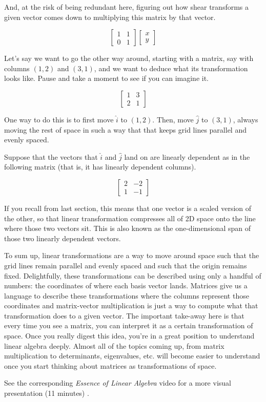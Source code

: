 And, at the risk of being redundant here, figuring out how shear transforms a
given vector comes down to multiplying this matrix by that vector.

\begin{equation*}
  \begin{bmatrix}
    1 & 1 \\
    0 & 1
  \end{bmatrix} \begin{bmatrix}
    x \\
    y
  \end{bmatrix}
\end{equation*}

Let's say we want to go the other way around, starting with a matrix, say with
columns $(1, 2)$ and $(3, 1)$, and we want to deduce what its transformation
looks like. Pause and take a moment to see if you can imagine it.

\begin{equation*}
  \begin{bmatrix}
    1 & 3 \\
    2 & 1
  \end{bmatrix}
\end{equation*}

One way to do this is to first move $\hat{i}$ to $(1, 2)$. Then, move $\hat{j}$
to $(3, 1)$, always moving the rest of space in such a way that that keeps grid
lines parallel and evenly spaced.

Suppose that the vectors that $\hat{i}$ and $\hat{j}$ land on are linearly
dependent as in the following matrix (that is, it has linearly dependent
columns).

\begin{equation*}
  \begin{bmatrix}
    2 & -2 \\
    1 & -1
  \end{bmatrix}
\end{equation*}

If you recall from last section, this means that one vector is a scaled version
of the other, so that linear transformation compresses all of 2D space onto the
line where those two vectors sit. This is also known as the one-dimensional span
of those two linearly dependent vectors.

To sum up, linear transformations are a way to move around space such that the
grid lines remain parallel and evenly spaced and such that the origin remains
fixed. Delightfully, these transformations can be described using only a handful
of numbers: the coordinates of where each basis vector lands. Matrices give us a
language to describe these transformations where the columns represent those
coordinates and matrix-vector multiplication is just a way to compute what that
transformation does to a given vector. The important take-away here is that
every time you see a matrix, you can interpret it as a certain transformation of
space. Once you really digest this idea, you're in a great position to
understand linear algebra deeply. Almost all of the topics coming up, from
matrix multiplication to determinants, eigenvalues, etc. will become easier to
understand once you start thinking about matrices as transformations of space.

\begin{remark}
  See the corresponding \textit{Essence of Linear Algebra} video for a more
  visual presentation (11 minutes)
  \cite{bib:linalg_linear_transformations_and_matrices}.
\end{remark}
